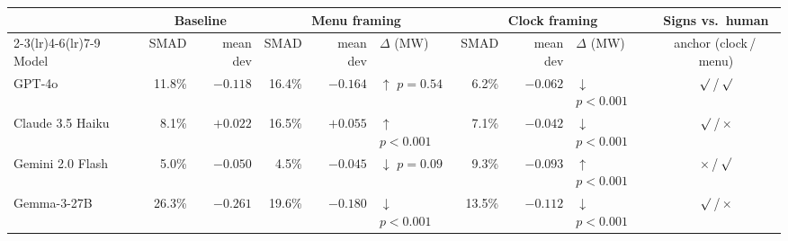 \begin{tabular}{l rr rrl rrl c}
\toprule
 & \multicolumn{2}{c}{Baseline} & \multicolumn{3}{c}{Menu framing} & \multicolumn{3}{c}{Clock framing} & Signs vs.\ human \\
\cmidrule(lr){2-3}\cmidrule(lr){4-6}\cmidrule(lr){7-9}
Model & SMAD & mean dev & SMAD & mean dev & $\Delta$ (MW) & SMAD & mean dev & $\Delta$ (MW) & anchor (clock\,/\,menu) \\
\midrule
GPT-4o & 11.8\% & $-0.118$ & 16.4\% & $-0.164$ & $\uparrow$ {\scriptsize $p=0.54$} & 6.2\% & $-0.062$ & $\downarrow$ {\scriptsize $p<0.001$} & $\surd$\,/\,$\surd$ \\
Claude 3.5 Haiku & 8.1\% & $+0.022$ & 16.5\% & $+0.055$ & $\uparrow$ {\scriptsize $p<0.001$} & 7.1\% & $-0.042$ & $\downarrow$ {\scriptsize $p<0.001$} & $\surd$\,/\,$\times$ \\
Gemini 2.0 Flash & 5.0\% & $-0.050$ & 4.5\% & $-0.045$ & $\downarrow$ {\scriptsize $p=0.09$} & 9.3\% & $-0.093$ & $\uparrow$ {\scriptsize $p<0.001$} & $\times$\,/\,$\surd$ \\
Gemma-3-27B & 26.3\% & $-0.261$ & 19.6\% & $-0.180$ & $\downarrow$ {\scriptsize $p<0.001$} & 13.5\% & $-0.112$ & $\downarrow$ {\scriptsize $p<0.001$} & $\surd$\,/\,$\times$ \\
\bottomrule
\end{tabular}
